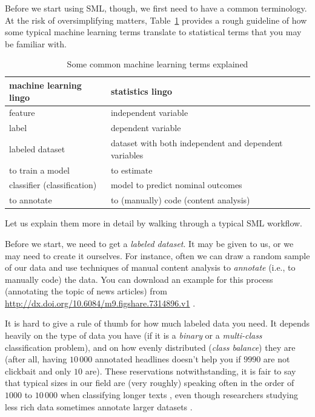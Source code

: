 Before we start using SML, though, we first need to have
a common terminology.
At the risk of oversimplifying matters, Table~\ref{tab:mllingo} provides a rough
guideline of how some typical machine learning terms translate to statistical
terms that you may be familiar with.

\begin{table}
\caption{\label{tab:mllingo}Some common machine learning terms explained}{
  \centering
\begin{tabularx}{\textwidth}{XX}
\toprule
machine learning lingo  & statistics lingo\\
\midrule
feature                 & independent variable  \\
label                   & dependent variable  \\
labeled dataset         & dataset with both independent and dependent variables\\
to train a model        & to estimate \\
classifier (classification)  & model to predict nominal outcomes \\
to annotate             & to (manually) code (content analysis) \\
\bottomrule
\end{tabularx}}{}
\end{table}

Let us explain them more in detail by walking through a typical SML workflow.

Before we start, we need to get a \emph{labeled dataset}.
It may be given to us, or we may need to create it ourselves.
For instance, often we can draw a random sample of our data and use techniques
of manual content analysis \citep[e.g.,][]{riffe2019analyzing} to
\emph{annotate} (i.e., to manually code) the data.
You can download an example for this process (annotating the topic of news
articles) from \url{http://dx.doi.org/10.6084/m9.figshare.7314896.v1} \citep{Vermeer2018}.

It is hard to give a rule of thumb for how much labeled data you need.
It depends heavily on the type of data you have (if it is a \emph{binary} or a \emph{multi-class} classification problem), and on how evenly distributed (\emph{class balance}) they are (after all, having $10\,000$ annotated headlines doesn't help you if $9990$ are not clickbait and only $10$ are).
These reservations notwithstanding, it is fair to say that typical sizes in
our field are (very roughly) speaking often in the order of $1000$ to $10\,000$
when classifying longer texts \citep[see][]{Burscher2014},
even though researchers studying less rich data sometimes annotate larger
datasets \citep[e.g., $60\,000$ social media messages in][]{vermeer2019seeing}.

